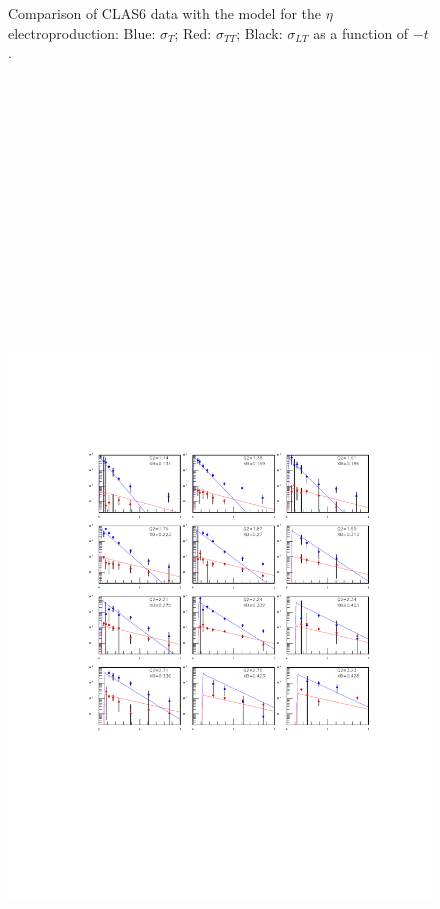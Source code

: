 \documentclass[prc,floatfix,superscriptaddress]{revtex4}
\begin{document}
\begin{figure}[t!]
{}
\label{eta_sf}
\vspace*{-70mm}
\caption{Comparison of CLAS6 data with the model for the $\eta$ electroproduction:
Blue: $\sigma_T$;
Red: $\sigma_{TT}$;
Black: $\sigma_{LT}$ as a function of $-t$.
}
\label{fig:eta_sf}
\end{figure}


\begin{figure}[t!]
\vspace*{-10 mm}
\centerline{
\includegraphics[height=30cm]{../Test_plots/pi0_HT2_ET2.pdf}
}
\end{figure}
\end{document}
